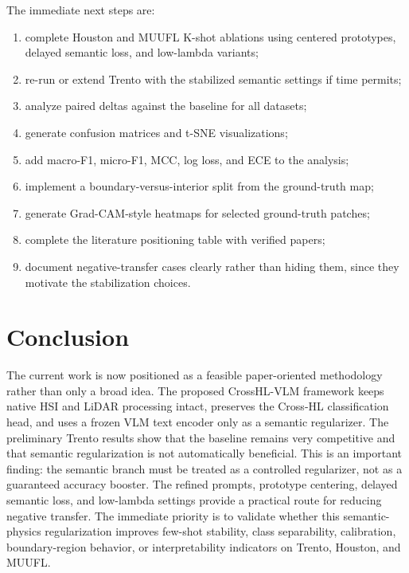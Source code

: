 \documentclass[10pt,journal,compsoc]{IEEEtran}
\begin{document}
The immediate next steps are:

\begin{enumerate}
    \item complete Houston and MUUFL K-shot ablations using centered prototypes, delayed semantic loss, and low-lambda variants;
    \item re-run or extend Trento with the stabilized semantic settings if time permits;
    \item analyze paired deltas against the baseline for all datasets;
    \item generate confusion matrices and t-SNE visualizations;
    \item add macro-F1, micro-F1, MCC, log loss, and ECE to the analysis;
    \item implement a boundary-versus-interior split from the ground-truth map;
    \item generate Grad-CAM-style heatmaps for selected ground-truth patches;
    \item complete the literature positioning table with verified papers;
    \item document negative-transfer cases clearly rather than hiding them, since they motivate the stabilization choices.
\end{enumerate}

\section{Conclusion}

The current work is now positioned as a feasible paper-oriented methodology rather than only a broad idea. The proposed CrossHL-VLM framework keeps native HSI and LiDAR processing intact, preserves the Cross-HL classification head, and uses a frozen VLM text encoder only as a semantic regularizer. The preliminary Trento results show that the baseline remains very competitive and that semantic regularization is not automatically beneficial. This is an important finding: the semantic branch must be treated as a controlled regularizer, not as a guaranteed accuracy booster. The refined prompts, prototype centering, delayed semantic loss, and low-lambda settings provide a practical route for reducing negative transfer. The immediate priority is to validate whether this semantic-physics regularization improves few-shot stability, class separability, calibration, boundary-region behavior, or interpretability indicators on Trento, Houston, and MUUFL.
\end{document}
